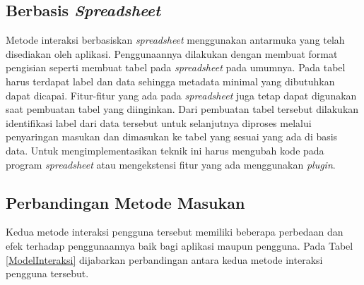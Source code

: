 	\subsection{Berbasis \textit{Spreadsheet}}
	Metode interaksi berbasiskan \textit{spreadsheet} menggunakan antarmuka yang telah disediakan oleh aplikasi. Penggunaannya dilakukan dengan membuat format pengisian seperti membuat tabel pada \textit{spreadsheet} pada umumnya. Pada tabel harus terdapat label dan data sehingga metadata minimal yang dibutuhkan dapat dicapai. Fitur-fitur yang ada pada \textit{spreadsheet} juga tetap dapat digunakan saat pembuatan tabel yang diinginkan. Dari pembuatan tabel tersebut dilakukan identifikasi label dari data tersebut untuk selanjutnya diproses melalui penyaringan masukan dan dimasukan ke tabel yang sesuai yang ada di basis data. Untuk mengimplementasikan teknik ini harus mengubah kode pada program \textit{spreadsheet} atau mengekstensi fitur yang ada menggunakan \textit{plugin}. 

	\subsection{Perbandingan Metode Masukan}
	Kedua metode interaksi pengguna tersebut memiliki beberapa perbedaan dan efek terhadap penggunaannya baik bagi aplikasi maupun pengguna. Pada Tabel \ref{ModelInteraksi} dijabarkan perbandingan antara kedua metode interaksi pengguna tersebut.

